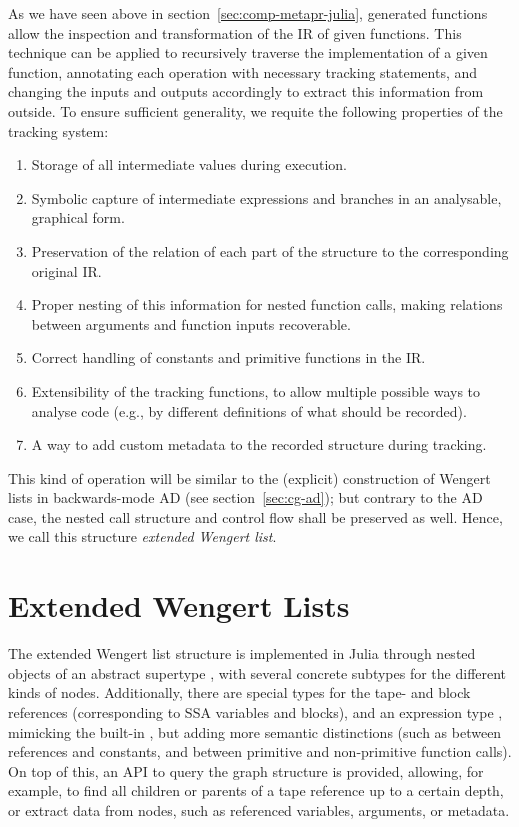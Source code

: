 As we have seen above in section~\ref{sec:comp-metapr-julia}, generated functions allow the
inspection and transformation of the IR of given functions.  This technique can be applied to
recursively traverse the implementation of a given function, annotating each operation with
necessary tracking statements, and changing the inputs and outputs accordingly to extract this
information from outside.  To ensure sufficient generality, we requite the following properties of
the tracking system:
\enlargethispage{\baselineskip}
\begin{enumerate}
  \firmlist
\item Storage of all intermediate values during execution.
\item Symbolic capture of intermediate expressions and branches in an analysable, graphical form.
\item Preservation of the relation of each part of the structure to the corresponding original IR.
\item Proper nesting of this information for nested function calls, making relations between
  arguments and function inputs recoverable.
\item Correct handling of constants and primitive functions in the IR.
\item Extensibility of the tracking functions, to allow multiple possible ways to analyse code
  (e.g., by different definitions of what should be recorded).
\item A way to add custom metadata to the recorded structure during tracking.
\end{enumerate}
This kind of operation will be similar to the (explicit) construction of Wengert lists in
backwards-mode AD (see section~\ref{sec:cg-ad}); but contrary to the AD case, the nested call
structure and control flow shall be preserved as well.  Hence, we call this structure \emph{extended
  Wengert list}.

\section{Extended Wengert Lists}
\label{sec:exteded-wengert-lists}

The extended Wengert list structure is implemented in Julia through nested objects of an abstract
supertype , with several concrete subtypes for the different kinds of nodes.
Additionally, there are special types for the tape- and block references (corresponding to SSA
variables and blocks), and an expression type , mimicking the built-in
, but adding more semantic distinctions (such as between references and constants, and
between primitive and non-primitive function calls).  On top of this, an API to query the graph
structure is provided, allowing, for example, to find all children or parents of a tape reference up
to a certain depth, or extract data from nodes, such as referenced variables, arguments, or
metadata.

